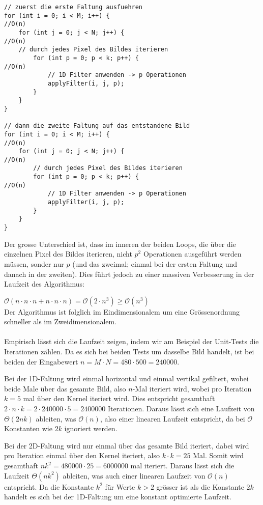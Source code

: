 \documentclass{article} %
\begin{document}
\begin{lstlisting}
// zuerst die erste Faltung ausfuehren
for (int i = 0; i < M; i++) {													//O(n)
	for (int j = 0; j < N; j++) {												//O(n)
	// durch jedes Pixel des Bildes iterieren
		for (int p = 0; p < k; p++) {											//O(n)
			// 1D Filter anwenden -> p Operationen
			applyFilter(i, j, p);
		}
	}
}

// dann die zweite Faltung auf das entstandene Bild
for (int i = 0; i < M; i++) {													//O(n)
	for (int j = 0; j < N; j++) {												//O(n)
		// durch jedes Pixel des Bildes iterieren
		for (int p = 0; p < k; p++) {											//O(n)
			// 1D Filter anwenden -> p Operationen
			applyFilter(i, j, p);
		}
	}
}
\end{lstlisting}
Der grosse Unterschied ist, dass im inneren der beiden Loops, die über die einzelnen Pixel des Bildes iterieren, nicht $p^2$ Operationen ausgeführt werden müssen, sonder nur $p$ (und das zweimal; einmal bei der ersten Faltung und danach in der zweiten). Dies führt jedoch zu einer massiven Verbesserung in der Laufzeit des Algorithmus:

$\mathcal{O} (n \cdot n \cdot n + n \cdot n \cdot n) = \mathcal{O}(2 \cdot n^3) \geq \mathcal{O} (n^3)$ \\
Der Algorithmus ist folglich im Eindimensionalem um eine Grössenordnung schneller als im Zweidimensionalem. \\ \\
Empirisch lässt sich die Laufzeit zeigen, indem wir am Beispiel der Unit-Tests die Iterationen zählen. Da es sich bei beiden Tests um dasselbe Bild handelt, ist bei beiden der Eingabewert $n = M \cdot N = 480 \cdot 500 = 240000$.

Bei der 1D-Faltung wird einmal horizontal und einmal vertikal gefiltert, wobei beide Male über das gesamte Bild, also $n$-Mal iteriert wird, wobei pro Iteration $k = 5$ mal über den Kernel iteriert wird. Dies entspricht gesamthaft $2 \cdot n \cdot k = 2 \cdot 240000 \cdot 5 = 2400000$ Iterationen. Daraus lässt sich eine Laufzeit von $\Theta (2nk)$ ableiten, was $\mathcal{O} (n)$, also einer linearen Laufzeit entspricht, da bei $\mathcal{O}$ Konstanten wie $2k$ ignoriert werden.

Bei der 2D-Faltung wird nur einmal über das gesamte Bild iteriert, dabei wird pro Iteration einmal über den Kernel iteriert, also $k \cdot k = 25$ Mal. Somit wird gesamthaft $nk^2 = 480000 \cdot 25 = 6000000$ mal iteriert. Daraus lässt sich die Laufzeit $\Theta (nk^2)$ ableiten, was auch einer linearen Laufzeit von $\mathcal{O} (n)$ entspricht. Da die Konstante $k^2$ für Werte $k > 2$ grösser ist als die Konstante $2k$ handelt es sich bei der 1D-Faltung um eine konstant optimierte Laufzeit.
\end{document}
